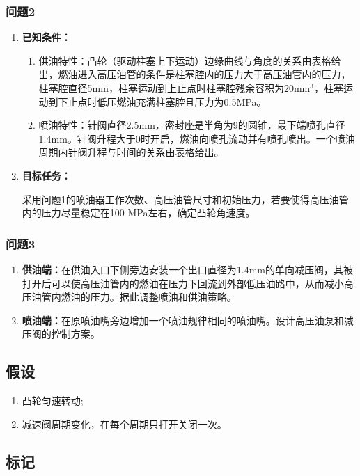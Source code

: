 \documentclass{article}
\newcounter{sub}
\begin{document}
\subsubsection{问题2}
\begin{enumerate}
	\item \textbf{已知条件：}
		\begin{enumerate}
			\item 供油特性：凸轮（驱动柱塞上下运动）边缘曲线与角度的关系由表格给出，燃油进入高压油管的条件是柱塞腔内的压力大于高压油管内的压力，柱塞腔直径5mm，柱塞运动到上止点时柱塞腔残余容积为$20\text{mm}^3$，柱塞运动到下止点时低压燃油充满柱塞腔且压力为0.5MPa。
			\item 喷油特性：针阀直径2.5mm，密封座是半角为9的圆锥，最下端喷孔直径1.4mm。针阀升程大于0时开启，燃油向喷孔流动并有喷孔喷出。一个喷油周期内针阀升程与时间的关系由表格给出。
		\end{enumerate}

	\item \textbf{目标任务：}

		采用问题1的喷油器工作次数、高压油管尺寸和初始压力，若要使得高压油管内的压力尽量稳定在100 MPa左右，确定凸轮角速度。
\end{enumerate}


\subsubsection{问题3}
\begin{enumerate}
	\item \textbf{供油端：}在供油入口下侧旁边安装一个出口直径为1.4mm的单向减压阀，其被打开后可以使高压油管内的燃油在压力下回流到外部低压油路中，从而减小高压油管内燃油的压力。据此调整喷油和供油策略。
	\item \textbf{喷油端：}在原喷油嘴旁边增加一个喷油规律相同的喷油嘴。设计高压油泵和减压阀的控制方案。
\end{enumerate}

\subsection{假设}%
\label{sub:假设}
\begin{enumerate}
	\item 凸轮匀速转动;
	\item 减速阀周期变化，在每个周期只打开关闭一次。
\end{enumerate}

\subsection{标记}%
\label{sub:标记}
\end{document}

